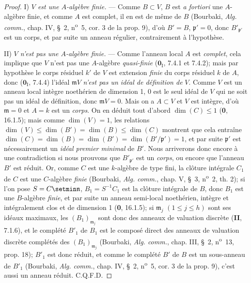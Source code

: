 \begin{proof}
I) \emph{$V$ est une $A$-algèbre finie.} --- Comme $B\subset V$, $B$ est
\emph{a fortiori} une $A$-algèbre finie, et comme $A$ est complet, il en est
de même de $B$ (Bourbaki, \emph{Alg. comm.}, chap. IV, \S~2,
n\textsuperscript{o}~5, cor. 3 de la prop. 9), d'où $B'=B$,
$\mathfrak p'=0$, donc $B'_{\mathfrak p'}$ est un corps, et par suite un
anneau régulier, contrairement à l'hypothèse.

II) \emph{$V$ n'est pas une $A$-algèbre finie.} --- Comme l'anneau local
$A$ est \emph{complet}, cela implique que $V$ n'est pas une $A$-algèbre
\emph{quasi-finie} ($\mathbf{0}_{\mathrm I}$, 7.4.1 et 7.4.2); mais par hypothèse le corps
résiduel $k'$ de $V$ est extension \emph{finie} du corps résiduel $k$ de $A$,
donc ($\mathbf{0}_{\mathrm I}$, 7.4.4) l'idéal $\mathfrak mV$ \emph{n'est pas un idéal de
définition de} $V$. Comme $V$ est un anneau local intègre noethérien de
dimension 1, 0 est le seul idéal de $V$ qui ne soit pas un idéal de
définition, donc $\mathfrak mV=0$. Mais on a $A\subset V$ et $V$ est
intègre, d'où $\mathfrak m=0$ et $A=k$ est un \emph{corps}. On en déduit tout
d'abord $\dim(C)\leqslant1$ (\textbf{0}, 16.1.5); mais comme $\dim(V)=1$, les
relations
$\dim(V)\leqslant\dim(B')=\dim(B)\leqslant\dim(C)$
montrent que cela entraîne
$\dim(C)=\dim(B)=\dim(B')=\dim(B'/\mathfrak p')=1$, et par suite
$\mathfrak p'$ est nécessairement un \emph{idéal premier minimal} de $B'$. Nous
arriverons donc encore à une contradiction si nous prouvons que
$B'_{\mathfrak p'}$ est un \emph{corps}, ou encore que l'anneau $B'$ est réduit.
Or, comme $C$ est une $k$-algèbre de type fini, la clôture intégrale $C_1$
de $C$ est une $C$-algèbre \emph{finie} (Bourbaki, \emph{Alg. comm.}, chap. V,
\S~3, n\textsuperscript{o}~2, th. 2); si l'on pose
$S=C\setmin\mathfrak n$, $B_1=S^{-1}C_1$ est la clôture intégrale de $B$, donc
$B_1$ est une $B$-algèbre \emph{finie}, et par suite un anneau semi-local
noethérien, intègre et intégralement clos et de dimension 1 (\textbf{0}, 16.1.5); si
$\mathfrak m_j$ $(1\leqslant j\leqslant h)$ sont ses idéaux maximaux, les
$(B_1)_{\mathfrak m_j}$ sont donc des anneaux de valuation discrète (\textbf{II},
7.1.6), et le complété $B'_1$ de $B_1$ est le composé direct des anneaux de
valuation discrète complétés des $(B_1)_{\mathfrak m_j}$ (Bourbaki,
\emph{Alg. comm.}, chap. III, \S~2, n\textsuperscript{o}~13, prop. 18);
$B'_1$ est donc réduit, et comme le complété $B'$ de $B$ est un
sous-anneau de $B'_1$ (Bourbaki, \emph{Alg. comm.}, chap. IV, \S~2,
n\textsuperscript{o}~5, cor. 3 de la prop. 9), c'est aussi un anneau réduit.
C.Q.F.D.
\end{proof}

